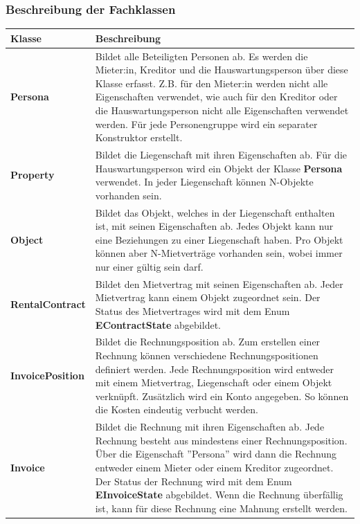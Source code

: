\subsubsection{Beschreibung der Fachklassen}
\begin{table}[H]
  \centering
  \settowidth{}
  \setlength\extrarowheight{2pt}
    \begin{tabulary}{1.0\textwidth}{|L|L|}
      \hline
      \textbf{Klasse}& \textbf{Beschreibung}\\
    \hline
    \textbf{Persona} & Bildet alle Beteiligten Personen ab. Es werden die Mieter:in, Kreditor und die Hauswartungsperson über diese Klasse erfasst. Z.B. für den Mieter:in werden nicht alle Eigenschaften verwendet, wie auch für den Kreditor oder die Hauswartungsperson nicht alle Eigenschaften verwendet werden. Für jede Personengruppe wird ein separater Konstruktor erstellt.\\
    \hline
    \textbf{Property} & Bildet die Liegenschaft mit ihren Eigenschaften ab. Für die Hauswartungsperson wird ein Objekt der Klasse \textbf{Persona} verwendet. In jeder Liegenschaft können N-Objekte vorhanden sein.\\
    \hline
    \textbf{Object} & Bildet das Objekt, welches in der Liegenschaft enthalten ist, mit seinen Eigenschaften ab. Jedes Objekt kann nur eine Beziehungen zu einer Liegenschaft haben. Pro Objekt können aber N-Mietverträge vorhanden sein, wobei immer nur einer gültig sein darf. \\
    \hline
    \textbf{RentalContract} & Bildet den Mietvertrag mit seinen Eigenschaften ab. Jeder Mietvertrag kann einem Objekt zugeordnet sein. Der Status des Mietvertrages wird mit dem Enum \textbf{EContractState} abgebildet.\\
    \hline
    \textbf{InvoicePosition} & Bildet die Rechnungsposition ab. Zum erstellen einer Rechnung können verschiedene Rechnungspositionen definiert werden. Jede Rechnungsposition wird entweder mit einem Mietvertrag, Liegenschaft oder einem Objekt verknüpft. Zusätzlich wird ein Konto angegeben. So können die Kosten eindeutig verbucht werden.\\
    \hline
    \textbf{Invoice} & Bildet die Rechnung mit ihren Eigenschaften ab. Jede Rechnung besteht aus mindestens einer Rechnungsposition. Über die Eigenschaft ''Persona'' wird dann die Rechnung entweder einem Mieter oder einem Kreditor zugeordnet. Der Status der Rechnung wird mit dem Enum \textbf{EInvoiceState} abgebildet. Wenn die Rechnung überfällig ist, kann für diese Rechnung eine Mahnung erstellt werden.\\

\end{tabulary}
\end{table}
